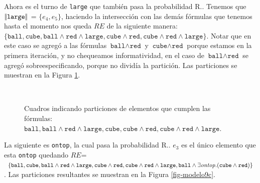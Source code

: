 Ahora es el turno de \texttt{large} que tambi\'en pasa la probabilidad R.\randomuse. Tenemos que $|\!|\texttt{large}|\!|$ = $\{e_4, e_5\}$, haciendo la intersecci\'on con las dem\'as f\'ormulas que tenemos hasta el momento nos queda $RE$ de la siguiente manera:
 $\{\texttt{ball}, \texttt{cube}, \texttt{ball} \wedge \texttt{red} \wedge \texttt{large}, \texttt{cube} \wedge \texttt{red} ,\texttt{cube} \wedge \texttt{red} \wedge \texttt{large} \}$. Notar que en este caso se agreg\'o a las f\'ormulas $\texttt{ball} \wedge \texttt{red}$ y $\texttt{cube} \wedge \texttt{red}$ porque estamos en la primera iteraci\'on, y no chequeamos informatividad, en el caso de  $\texttt{ball} \wedge \texttt{red}$ se agreg\'o sobreespecificando, porque no divid\'ia la partici\'on. Las particiones se muestran en la Figura \ref{fig-modelo9b}.

\begin{figure}[h]
\begin{center}
\\[0pt]
\caption{Cuadros indicando particiones de elementos que cumplen las f\'ormulas: $\texttt{ball}, \texttt{ball} \wedge \texttt{red} \wedge \texttt{large}, \texttt{cube},\texttt{cube} \wedge \texttt{red}, \texttt{cube} \wedge \texttt{red} \wedge \texttt{large}$.}
\label{fig-modelo9b}
\end{center}
\end{figure}

La siguiente es \texttt{ontop}, la cual pasa la probabilidad R.\randomuse. $e_3$ es el \'unico elemento que esta \texttt{ontop} quedando $RE$= $\{\texttt{ball}, \texttt{cube}, \texttt{ball} \wedge \texttt{red} \wedge \texttt{large}, \texttt{cube} \wedge \texttt{red}, \texttt{cube} \wedge \texttt{red} \wedge \texttt{large}, \texttt{ball} \wedge \exists \mathit{ontop}.(\texttt{cube} \wedge \texttt{red}) \}$. Las particiones resultantes se muestran en la Figura \ref{fig-modelo9c}.


